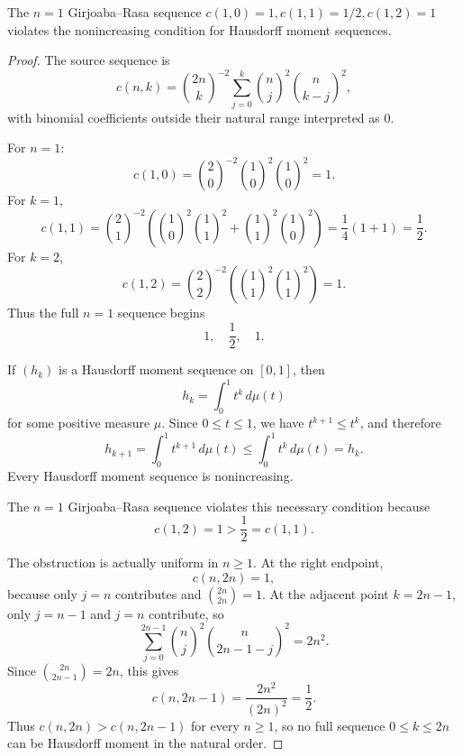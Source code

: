 \begin{counterexample}
\label{res:gr-cnk-n1-hausdorff-counterexample}
The \(n=1\) Girjoaba--Rasa sequence \(c(1,0)=1,c(1,1)=1/2,c(1,2)=1\) violates the nonincreasing condition for Hausdorff moment sequences.
\end{counterexample}
\begin{proof}
The source sequence is
\[
c(n,k)=\binom{2n}{k}^{-2}
\sum_{j=0}^k \binom{n}{j}^2\binom{n}{k-j}^2,
\]
with binomial coefficients outside their natural range interpreted as \(0\).

For \(n=1\):
\[
c(1,0)=\binom20^{-2}\binom10^2\binom10^2=1.
\]
For \(k=1\),
\[
c(1,1)=\binom21^{-2}
\left(\binom10^2\binom11^2+\binom11^2\binom10^2\right)
=\frac14(1+1)=\frac12.
\]
For \(k=2\),
\[
c(1,2)=\binom22^{-2}
\left(\binom11^2\binom11^2\right)=1.
\]
Thus the full \(n=1\) sequence begins
\[
1,\quad \frac12,\quad 1.
\]

If \((h_k)\) is a Hausdorff moment sequence on \([0,1]\), then
\[
h_k=\int_0^1 t^k\,d\mu(t)
\]
for some positive measure \(\mu\).  Since \(0\le t\le1\), we have \(t^{k+1}\le t^k\), and therefore
\[
h_{k+1}=\int_0^1 t^{k+1}\,d\mu(t)
\le
\int_0^1 t^k\,d\mu(t)=h_k.
\]
Every Hausdorff moment sequence is nonincreasing.

The \(n=1\) Girjoaba--Rasa sequence violates this necessary condition because
\[
c(1,2)=1>\frac12=c(1,1).
\]

The obstruction is actually uniform in \(n\ge1\).  At the right endpoint,
\[
c(n,2n)=1,
\]
because only \(j=n\) contributes and \(\binom{2n}{2n}=1\).  At the adjacent point \(k=2n-1\), only \(j=n-1\) and \(j=n\) contribute, so
\[
\sum_{j=0}^{2n-1}\binom{n}{j}^2\binom{n}{2n-1-j}^2
=2n^2.
\]
Since \(\binom{2n}{2n-1}=2n\), this gives
\[
c(n,2n-1)=\frac{2n^2}{(2n)^2}=\frac12.
\]
Thus \(c(n,2n)>c(n,2n-1)\) for every \(n\ge1\), so no full sequence \(0\le k\le2n\) can be Hausdorff moment in the natural order.
\end{proof}

